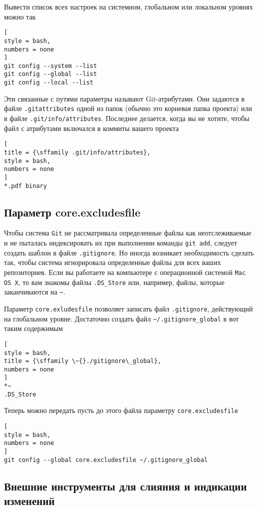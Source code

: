 \documentclass[%
	11pt,
	a4paper,
	utf8,
		]{article}
\begin{document}
Вывести список всех настроек на системном, глобальном или локальном уровнях можно так
\begin{lstlisting}[
style = bash,
numbers = none
]
git config --system --list
git config --global --list
git config --local --list
\end{lstlisting}

Эти связанные с путями параметры называют Git-атрибутами. Они задаются в файле \texttt{.gitattributes} одной из папок (обычно это корневая папка проекта) или в файле \texttt{.git/info/attributes}. Последнее делается, когда вы не хотите, чтобы файл с атрибутами включался в коммиты вашего проекта
\begin{lstlisting}[
title = {\sffamily .git/info/attributes},
style = bash,
numbers = none	
]
*.pdf binary
\end{lstlisting}

\subsection{Параметр core.excludesfile}

Чтобы система \texttt{Git} не рассматривала определенные файлы как неотслеживаемые и не пыталась индексировать их при выполнении команды \texttt{git add}, следует создать шаблон в файле \texttt{.gitignore}. Но иногда возникает необходимость сделать так, чтобы система игнорировала определенные файлы для всех ваших репозиториев. Если вы работаете на компьютере с операционной системой \texttt{Mac OS X}, то вам знакомы файлы \texttt{.DS\_Store} или, например, файлы, которые заканчиваются на \verb|~|.

Параметр \texttt{core.exludesfile} позволяет записать файл \texttt{.gitignore}, действующий на глобальном уровне. Достаточно создать файл \verb|~/.gitignore_global| в вот таким содержимым
\begin{lstlisting}[
style = bash,
title = {\sffamily \~{}./gitignore\_global},
numbers = none
]
*~
.DS_Store
\end{lstlisting}

Теперь можно передать пусть до этого файла параметру \texttt{core.excludesfile}
\begin{lstlisting}[
style = bash,
numbers = none
]
git config --global core.excludesfile ~/.gitignore_global
\end{lstlisting}

\subsection{Внешние инструменты для слияния и индикации изменений}
\end{document}
